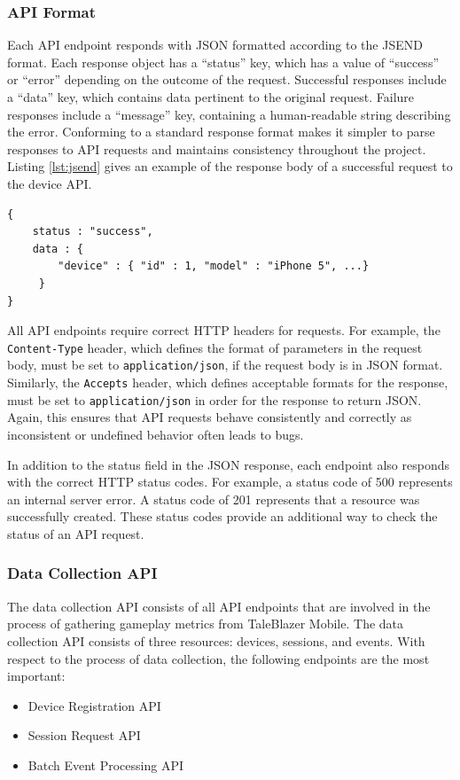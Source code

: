 \subsubsection{API Format}

Each API endpoint responds with JSON formatted according to the JSEND format. \cite{site:jsend} Each response object has a ``status'' key, which has a value of ``success'' or ``error'' depending on the outcome of the request. Successful responses include a ``data'' key, which contains data pertinent to the original request. Failure responses include a ``message'' key, containing a human-readable string describing the error. Conforming to a standard response format makes it simpler to parse responses to API requests and maintains consistency throughout the project. Listing \ref{lst:jsend} gives an example of the response body of a successful request to the device API.

\pagebreak
\begin{lstlisting}[caption={[API Response Format Example]Example API format, using JSEND}, label={lst:jsend}]
{
    status : "success",
    data : {
        "device" : { "id" : 1, "model" : "iPhone 5", ...}
     }
}
\end{lstlisting}

All API endpoints require correct HTTP headers for requests. For example, the \texttt{Content-Type} header, which defines the format of parameters in the request body, must be set to \texttt{application/json}, if the request body is in JSON format. Similarly, the \texttt{Accepts} header, which defines acceptable formats for the response, must be set to \texttt{application/json} in order for the response to return JSON. Again, this ensures that API requests behave consistently and correctly as inconsistent or undefined behavior often leads to bugs.

In addition to the status field in the JSON response, each endpoint also responds with the correct HTTP status codes. For example, a status code of 500 represents an internal server error. A status code of 201 represents that a resource was successfully created. These status codes provide an additional way to check the status of an API request.

\subsubsection{Data Collection API}
\label{subsec:collection_api}

The data collection API consists of all API endpoints that are involved in the process of gathering gameplay metrics from TaleBlazer Mobile. The data collection API consists of three resources: devices, sessions, and events. With respect to the process of data collection, the following endpoints are the most important:
	\begin{itemize}
		\item Device Registration API
		\item Session Request API
		\item Batch Event Processing API
	\end{itemize}

